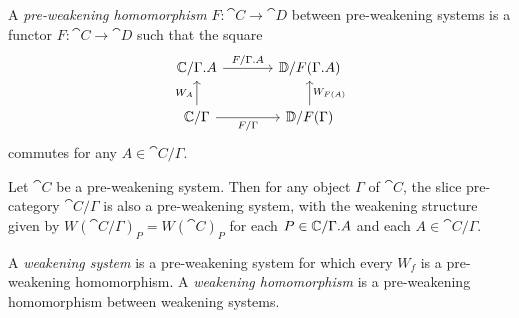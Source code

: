 \begin{defn}
A \emph{pre-weakening homomorphism} $F:\cat{C}\to\cat{D}$ between pre-weakening systems
is a functor $F:\cat{C}\to\cat{D}$ such that the square
\begin{equation*}
\begin{tikzcd}[column sep=large]
\cat{C}/\ctxext{\Gamma}{A}
  \arrow[r,"F/\ctxext{\Gamma}{A}"]
  &
\cat{D}/F(\ctxext{\Gamma}{A})
  \\
\cat{C}/\Gamma
  \arrow[u,"W_A"]
  \arrow[r,swap,"F/\Gamma"]
  &
\cat{D}/F(\Gamma)
  \arrow[u,swap,"W_{F(A)}"]
\end{tikzcd}
\end{equation*}
commutes for any $A\in\cat{C}/\Gamma$.
\end{defn}

\begin{lem}
Let $\cat{C}$ be a pre-weakening system. Then for any object $\Gamma$ of $\cat{C}$,
the slice pre-category $\cat{C}/\Gamma$ is also a pre-weakening system, with the weakening
structure given by $W(\cat{C}/\Gamma)_P=W(\cat{C})_P$ for each $P\in\cat{C}/\ctxext{\Gamma}{A}$
and each $A\in\cat{C}/\Gamma$.
\end{lem}

\begin{defn}
A \emph{weakening system} is a pre-weakening system for which every $W_f$ is a
pre-weakening homomorphism. A \emph{weakening homomorphism} is a pre-weakening 
homomorphism between weakening systems.
\end{defn}

